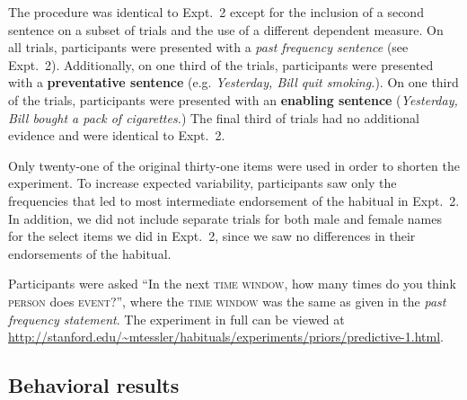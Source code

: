 \documentclass[10pt,letterpaper]{article}
\begin{document}
The procedure was identical to Expt.~2 except for the inclusion of a second sentence on a subset of trials and the use of a different dependent measure. 
On all trials, participants were presented with a \emph{past frequency sentence} (see Expt.~2).
Additionally, on one third of the trials, participants were presented with a \textbf{preventative sentence} (e.g. \emph{Yesterday, Bill quit smoking.}). %
On one third of the trials, participants were presented with an \textbf{enabling sentence} (\emph{Yesterday, Bill bought a pack of cigarettes.}) %
The final third of trials had no additional evidence and were identical to Expt.~2. 

Only twenty-one of the original thirty-one items were used in order to shorten the experiment.
To increase expected variability, participants saw only the frequencies that led to most intermediate endorsement of the habitual in Expt.~2. 
In addition, we did not include separate trials for both male and female names for the select items we did in Expt.~2, since we saw no differences in their endorsements of the habitual.

Participants were asked ``In the next \textsc{time window}, how many times do you think \textsc{person} does \textsc{event}?'', where the \textsc{time window} was the same as given in the \emph{past frequency statement}.
The experiment in full can be viewed at \url{http://stanford.edu/~mtessler/habituals/experiments/priors/predictive-1.html}.


\subsection{Behavioral results}
\end{document}

